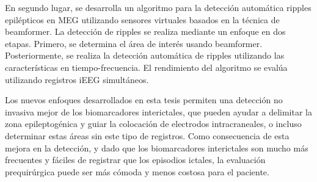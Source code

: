 \begin{resumen}
En segundo lugar, se desarrolla un algoritmo para la detección automática ripples epilépticos en MEG utilizando sensores virtuales basados en la técnica de beamformer. La detección de ripples se realiza mediante un enfoque en dos etapas. Primero, se determina el área de interés usando beamformer. Posteriormente, se realiza la detección automática de ripples utilizando las características en tiempo-frecuencia. El rendimiento del algoritmo se evalúa utilizando registros iEEG simultáneos.

Los nuevos enfoques desarrollados en esta tesis permiten una detección no invasiva mejor de los biomarcadores interictales, que pueden ayudar a delimitar la zona epileptogénica y guiar la colocación de electrodos intracraneales, o incluso determinar estas áreas sin este tipo de registros. Como consecuencia de esta mejora en la detección, y dado que los biomarcadores interictales son mucho más frecuentes y fáciles de registrar que los episodios ictales, la evaluación prequirúrgica puede ser más cómoda y menos costosa para el paciente. 

\end{resumen}